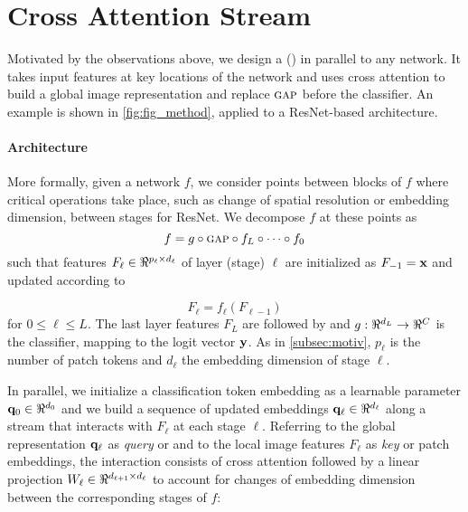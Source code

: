 \section{Cross Attention Stream}

\label{sec:ca_design}
Motivated by the observations above, we design a \emph{\OURS} (\emph{\Ours}) in parallel to any 
network. It takes input features at key locations of the network and uses cross attention to build 
a global image representation and replace ${\textsc{gap}}$ before the classifier. An example is shown in 
\autoref{fig:fig_method}, applied to a ResNet-based architecture.

\paragraph{Architecture}
More formally, given a network $f$, we consider points between blocks of $f$ where critical 
operations take place, such as change of spatial resolution or embedding dimension, \eg between 
stages for ResNet. We decompose $f$ at these points as
\begin{equation}
	f = g \circ {\textsc{gap}} \circ f_L \circ \dots \circ f_0
\label{eq:f-decomp}
\end{equation}
such that features $F_\ell \in \real^{p_\ell \times d_\ell}$ of layer (stage) $\ell$ are 
initialized as $F_{-1} = \mathbf{x}$ and updated according to

\begin{equation}
	F_\ell = f_\ell(F_{\ell-1})
\label{eq:f-layer}
\end{equation}
for $0 \le \ell \le L$. The last layer features $F_L$ are followed by \gap and $g: \real^{d_L} \to 
\real^C$ is the classifier, mapping to the logit vector $\mathbf{y}$. As in \autoref{subsec:motiv}, 
$p_\ell$ is the number of patch tokens and $d_\ell$ the embedding dimension of stage $\ell$.

In parallel, we initialize a classification token embedding as a learnable parameter $\vq_0 \in 
\real^{d_0}$ and we build a sequence of updated embeddings $\vq_\ell \in \real^{d_\ell}$ along a 
stream that interacts with $F_\ell$ at each stage $\ell$. Referring to the global representation 
$\mathbf{q}_\ell$ as \emph{query} or \cls and to the local image features $F_\ell$ as \emph{key} or patch 
embeddings, the interaction consists of cross attention followed by a linear projection $W_\ell \in 
\real^{d_{\ell+1} \times d_\ell}$ to account for changes of embedding dimension between the 
corresponding stages of $f$:

